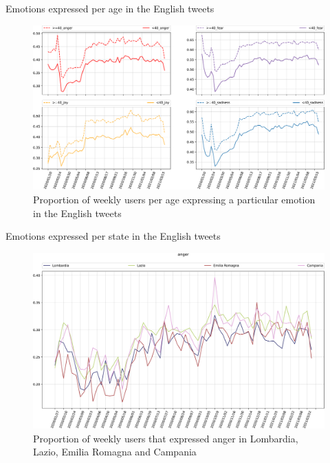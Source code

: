 \documentclass[8pt]{beamer}  %
\begin{document}
\begin{frame}{Emotions expressed per age in the English tweets}

    \begin{figure}[H]
	    \centering
    	\includegraphics[scale=.25]{assets/img/en_4_emotions_per_age_subplot_1.svg.pdf}
    	\caption{Proportion of weekly users per age expressing a particular emotion in the English tweets}
    	\label{fig:en-4-emotions-per-age-subplot-1}
    \end{figure}
    
\end{frame}

\begin{frame}{Emotions expressed per state in the English tweets}

    \begin{figure}[H]
	    \centering
    	\includegraphics[scale=.25]{assets/img/it_anger_4_states.svg.pdf}
    	\caption{Proportion of weekly users that expressed anger in Lombardia, Lazio, Emilia Romagna and Campania}
    	\label{fig:it-anger-4-states}
    \end{figure}
    
\end{frame}
\end{document}

